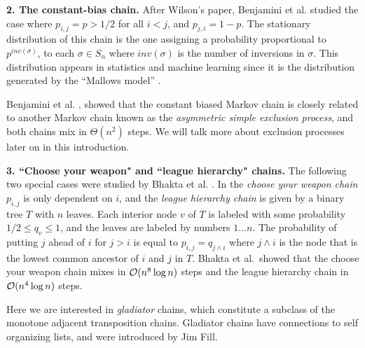 \documentclass[10 pt]{article}
\begin{document}
 \smallskip
\textbf{2. The constant-bias chain.} After Wilson's paper, Benjamini et al. \cite{Benjamini} studied the case where $p_{i,j}=p>1/2$ for all $i<j$,
and $p_{j,i}=1{-}p$.  The stationary distribution of this chain is the one assigning a probability  proportional to $p^{inv(\sigma)}$,
to each $\sigma\in S_n$ where $inv(\sigma)$ is the number of inversions in $\sigma$. This distribution appears in statistics and machine
learning since it is the distribution generated by the ``Mallows model'' \cite{Mallow, Mallow2}.

Benjamini et al. \cite{Benjamini}, showed that the constant biased Markov chain is closely related to another Markov chain known as
the \emph{asymmetric simple exclusion process}, and both chains mix in $\Theta(n^2)$ steps. We will talk more about exclusion processes
later on in this introduction.

 \smallskip

\textbf{3. ``Choose your weapon" and ``league hierarchy" chains.} The following two special cases were studied by Bhakta et al. \cite{Dana}.
In the \emph {choose your weapon chain} $p_{i,j}$ is only dependent on $i$, and the \emph{league hierarchy chain} is given by a binary tree
$T$ with $n$ leaves. Each interior node $v$ of $T$ is labeled with some probability $1/2 \leq q_v\leq 1$, and the leaves are labeled by numbers
$1\dots n$. The probability of putting $j$ ahead of $i$ for $j>i$ is equal to $p_{i,j}=q_{ j \wedge i}$ where $j\wedge i$ is the node that
is the lowest common ancestor of $i$ and $j$ in $T$. Bhakta et al.\ showed that the choose your weapon chain mixes in ${\cal O}(n^8\log n)$
steps and the league hierarchy chain in ${\cal O}(n^4 \log n)$ steps. 
\medskip

Here we are interested in \emph{gladiator} chains, which constitute a subclass of the monotone adjacent transposition chains. Gladiator chains
have connections to self organizing lists, and were introduced by Jim Fill.
\medskip
\end{document}
